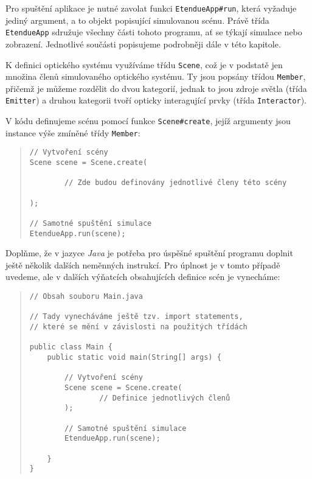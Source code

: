 Pro spuštění aplikace je nutné zavolat funkci \texttt{EtendueApp\#run}, která vyžaduje jediný argument, a to objekt popisující simulovanou scénu. Právě třída \texttt{EtendueApp} sdružuje všechny části tohoto programu, ať se týkají simulace nebo zobrazení. Jednotlivé součásti popisujeme podrobněji dále v této kapitole.

K definici optického systému využíváme třídu \texttt{Scene}, což je v podstatě jen množina členů simulovaného optického systému. Ty jsou popsány třídou \texttt{Member}, přičemž je můžeme rozdělit do dvou kategorií, jednak to jsou zdroje světla (třída \texttt{Emitter}) a druhou kategorii tvoří opticky interagující prvky (třída \texttt{Interactor}).

V kódu definujeme scénu pomocí funkce \texttt{Scene\#create}, jejíž argumenty jsou instance výše zmíněné třídy \texttt{Member}:

\begin{minipage}{\textwidth}\begin{quote}\begin{lstlisting}
// Vytvoření scény
Scene scene = Scene.create(

        // Zde budou definovány jednotlivé členy této scény

);

// Samotné spuštění simulace
EtendueApp.run(scene);
\end{lstlisting}\end{quote}\end{minipage}

Doplňme, že v jazyce \emph{Java} je potřeba pro úspěšné spuštění programu doplnit ještě několik dalších neměnných instrukcí. Pro úplnost je v tomto případě uvedeme, ale v dalších výňatcích obsahujících definice scén je vynecháme:

\begin{minipage}{\textwidth}\begin{quote}\begin{lstlisting}
// Obsah souboru Main.java

// Tady vynecháváme ještě tzv. import statements,
// které se mění v závislosti na použitých třídách

public class Main {
    public static void main(String[] args) {

        // Vytvoření scény
        Scene scene = Scene.create(
                // Definice jednotlivých členů
        );

        // Samotné spuštění simulace
        EtendueApp.run(scene);

    }
}
\end{lstlisting}\end{quote}\end{minipage}

